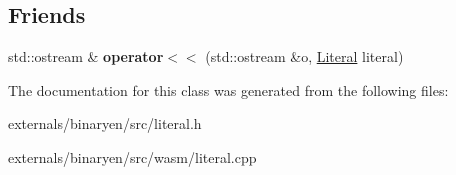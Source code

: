 \subsection*{Friends}
\begin{DoxyCompactItemize}
\item 
\mbox{\label{classwasm_1_1_literal_ad68dcb58c534b3934bbb8b72e5c60ea8}} 
std\+::ostream \& {\bfseries operator$<$$<$} (std\+::ostream \&o, \mbox{\hyperlink{classwasm_1_1_literal}{Literal}} literal)
\end{DoxyCompactItemize}


The documentation for this class was generated from the following files\+:\begin{DoxyCompactItemize}
\item 
externals/binaryen/src/literal.\+h\item 
externals/binaryen/src/wasm/literal.\+cpp\end{DoxyCompactItemize}
